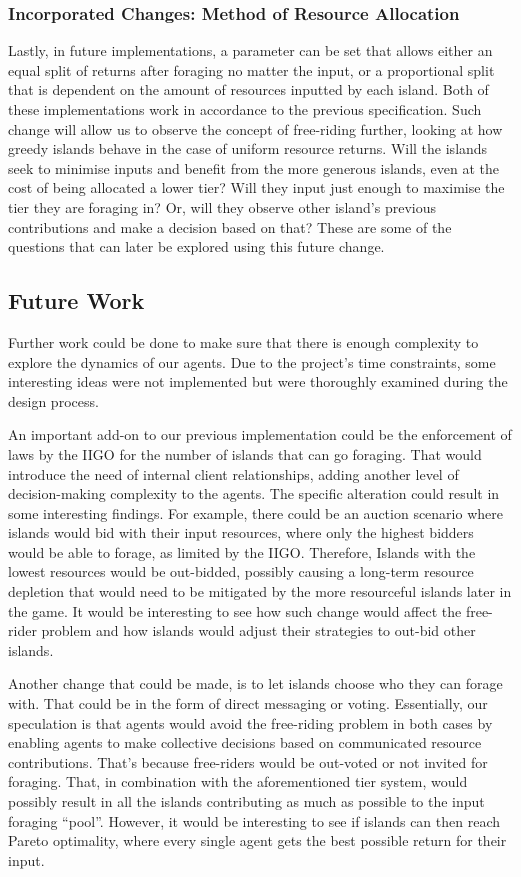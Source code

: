 \subsubsection{Incorporated Changes: Method of Resource Allocation}

Lastly, in future implementations, a parameter can be set that allows either an equal split of returns after foraging no matter the input, or a proportional split that is dependent on the amount of resources inputted by each island. Both of these implementations work in accordance to the previous specification. Such change will allow us to observe the concept of free-riding further, looking at how greedy islands behave in the case of uniform resource returns. Will the islands seek to minimise inputs and benefit from the more generous islands, even at the cost of being allocated a lower tier? Will they input just enough to maximise the tier they are foraging in? Or, will they observe other island’s previous contributions and make a decision based on that? These are some of the questions that can later be explored using this future change.

\subsection{Future Work}

Further work could be done to make sure that there is enough complexity to explore the dynamics of our agents. Due to the project’s time constraints, some interesting ideas were not implemented but were thoroughly examined during the design process.

An important add-on to our previous implementation could be the enforcement of laws by the IIGO for the number of islands that can go foraging. That would introduce the need of internal client relationships, adding another level of decision-making complexity to the agents. The specific alteration could result in some interesting findings. For example, there could be an auction scenario where islands would bid with their input resources, where only the highest bidders would be able to forage, as limited by the IIGO. Therefore, Islands with the lowest resources would be out-bidded, possibly causing a long-term resource depletion that would need to be mitigated by the more resourceful islands later in the game. It would be interesting to see how such change would affect the free-rider problem and how islands would adjust their strategies to out-bid other islands.

Another change that could be made, is to let islands choose who they can forage with. That could be in the form of direct messaging or voting. Essentially, our speculation is that agents would avoid the free-riding problem in both cases by enabling agents to make collective decisions based on communicated resource contributions. That’s because free-riders would be out-voted or not invited for foraging. That, in combination with the aforementioned tier system, would possibly result in all the islands contributing as much as possible to the input foraging “pool”.  However, it would be interesting to see if islands can then reach Pareto optimality, where every single agent gets the best possible return for their input.

